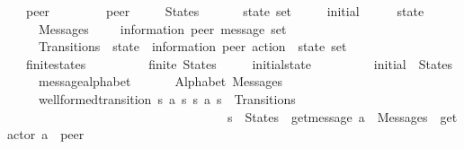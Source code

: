 \begin{isabellebody}
\ \ \ peer\ \ \ \ \ \ \ \ {\isacharcolon}{\kern0pt}{\isacharcolon}{\kern0pt}\ {\isachardoublequoteopen}{\isacharprime}{\kern0pt}peer{\isachardoublequoteclose}\isanewline
\ \ \ \ \ States\ \ \ \ \ \ {\isacharcolon}{\kern0pt}{\isacharcolon}{\kern0pt}\ {\isachardoublequoteopen}{\isacharprime}{\kern0pt}state\ set{\isachardoublequoteclose}\isanewline
\ \ \ \ \ initial\ \ \ \ \ {\isacharcolon}{\kern0pt}{\isacharcolon}{\kern0pt}\ {\isachardoublequoteopen}{\isacharprime}{\kern0pt}state{\isachardoublequoteclose}\isanewline
\ \ \ \ \ Messages\ \ \ \ {\isacharcolon}{\kern0pt}{\isacharcolon}{\kern0pt}\ {\isachardoublequoteopen}{\isacharparenleft}{\kern0pt}{\isacharprime}{\kern0pt}information{\isacharcomma}{\kern0pt}\ {\isacharprime}{\kern0pt}peer{\isacharparenright}{\kern0pt}\ message\ set{\isachardoublequoteclose}\isanewline
\ \ \ \ \ Transitions\ {\isacharcolon}{\kern0pt}{\isacharcolon}{\kern0pt}\ {\isachardoublequoteopen}{\isacharparenleft}{\kern0pt}{\isacharprime}{\kern0pt}state\ {\isasymtimes}\ {\isacharparenleft}{\kern0pt}{\isacharprime}{\kern0pt}information{\isacharcomma}{\kern0pt}\ {\isacharprime}{\kern0pt}peer{\isacharparenright}{\kern0pt}\ action\ {\isasymtimes}\ {\isacharprime}{\kern0pt}state{\isacharparenright}{\kern0pt}\ set{\isachardoublequoteclose}\isanewline
\ \ \ finite{\isacharunderscore}{\kern0pt}states{\isacharcolon}{\kern0pt}\ \ \ \ \ \ \ \ \ \ {\isachardoublequoteopen}finite\ States{\isachardoublequoteclose}\isanewline
\ \ \ \ \ initial{\isacharunderscore}{\kern0pt}state{\isacharcolon}{\kern0pt}\ \ \ \ \ \ \ \ \ \ {\isachardoublequoteopen}initial\ {\isasymin}\ States{\isachardoublequoteclose}\isanewline
\ \ \ \ \ message{\isacharunderscore}{\kern0pt}alphabet{\isacharcolon}{\kern0pt}\ \ \ \ \ \ \ {\isachardoublequoteopen}Alphabet\ Messages{\isachardoublequoteclose}\isanewline
\ \ \ \ \ well{\isacharunderscore}{\kern0pt}formed{\isacharunderscore}{\kern0pt}transition{\isacharcolon}{\kern0pt}\ {\isachardoublequoteopen}{\isasymAnd}s{}\ a\ s{}{\isachardot}{\kern0pt}\ {\isacharparenleft}{\kern0pt}s{}{\isacharcomma}{\kern0pt}\ a{\isacharcomma}{\kern0pt}\ s{}{\isacharparenright}{\kern0pt}\ {\isasymin}\ Transitions\ {\isasymLongrightarrow}\isanewline
\ \ \ \ \ \ \ \ \ \ \ \ \ \ \ \ \ \ \ \ \ \ \ \ \ \ \ \ \ \ \ \ \ \ \ s{}\ {\isasymin}\ States\ {\isasymand}\ get{\isacharunderscore}{\kern0pt}message\ a\ {\isasymin}\ Messages\ {\isasymand}\ get{\isacharunderscore}{\kern0pt}actor\ a\ {\isacharequal}{\kern0pt}\ peer\ {\isasymand}\isanewline

\end{isabellebody}
